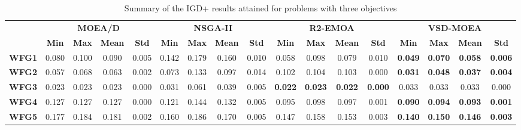 \begin{table*}[t]
\caption{Summary of the IGD+ results attained for problems with three objectives}
\label{tab:StatisticsIGDP_3obj}
\centering
\begin{scriptsize}
\begin{tabular}{cc|c|c|c|c|c|c|c|c|c|c|c|c|c|c|c}
\cline{2-17}
\textbf{}                           & \multicolumn{4}{c|}{\textbf{MOEA/D}}                       & \multicolumn{4}{c|}{\textbf{NSGA-II}}                      & \multicolumn{4}{c|}{\textbf{R2-EMOA}}                             & \multicolumn{4}{c}{\textbf{VSD-MOEA}}                            \\ \cline{2-17} 
                                    & \textbf{Min} & \textbf{Max} & \textbf{Mean} & \textbf{Std} & \textbf{Min} & \textbf{Max} & \textbf{Mean} & \textbf{Std} & \textbf{Min}   & \textbf{Max}   & \textbf{Mean}  & \textbf{Std}   & \textbf{Min}   & \textbf{Max}   & \textbf{Mean}  & \textbf{Std}   \\ \hline
\multicolumn{1}{c|}{\textbf{WFG1}}  & 0.080        & 0.100        & 0.090         & 0.005        & 0.142        & 0.179        & 0.160         & 0.010        & 0.058          & 0.098          & 0.079          & 0.010          & \textbf{0.049} & \textbf{0.070} & \textbf{0.058} & \textbf{0.006} \\ \hline
\multicolumn{1}{c|}{\textbf{WFG2}}  & 0.057        & 0.068        & 0.063         & 0.002        & 0.073        & 0.133        & 0.097         & 0.014        & 0.102          & 0.104          & 0.103          & 0.000          & \textbf{0.031} & \textbf{0.048} & \textbf{0.037} & \textbf{0.004} \\ \hline
\multicolumn{1}{c|}{\textbf{WFG3}}  & 0.023        & 0.023        & 0.023         & 0.000        & 0.031        & 0.061        & 0.039         & 0.005        & \textbf{0.022} & \textbf{0.023} & \textbf{0.022} & \textbf{0.000} & 0.033          & 0.033          & 0.033          & 0.000          \\ \hline
\multicolumn{1}{c|}{\textbf{WFG4}}  & 0.127        & 0.127        & 0.127         & 0.000        & 0.121        & 0.144        & 0.132         & 0.005        & 0.095          & 0.098          & 0.097          & 0.001          & \textbf{0.090} & \textbf{0.094} & \textbf{0.093} & \textbf{0.001} \\ \hline
\multicolumn{1}{c|}{\textbf{WFG5}}  & 0.177        & 0.184        & 0.181         & 0.002        & 0.160        & 0.186        & 0.170         & 0.005        & 0.147          & 0.158          & 0.153          & 0.003          & \textbf{0.140} & \textbf{0.150} & \textbf{0.146} & \textbf{0.003} \\ \hline

\end{tabular}
\end{scriptsize}
\end{table*}
